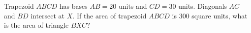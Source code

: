 Trapezoid $ABCD$ has bases $AB=20$ units and $CD=30$ units. Diagonals $AC$ and $BD$ intersect at $X$. If the area of trapezoid $ABCD$ is $300$ square units, what is the area of triangle $BXC$?

